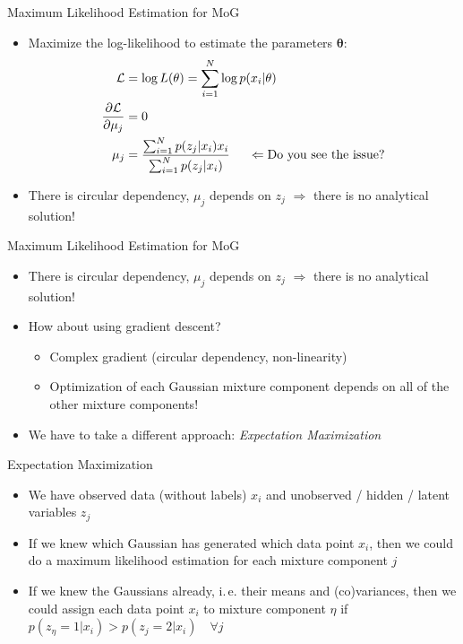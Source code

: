 \begin{frame}{Maximum Likelihood Estimation for MoG}{}
	\begin{itemize}
		\item Maximize the log-likelihood to estimate the parameters $\bm{\theta}$:
		\begin{align}
			\mathcal{L} &= \log L(\theta) = \sum_{i=1}^N \log p(x_i|\theta)\\
			\frac{\partial \mathcal{L}}{\partial \mu_j} &= 0\\
			\mu_j &= \frac{\sum_{i=1}^N p(z_j|x_i) x_i}{\sum_{i=1}^N p(z_j|x_i)}\hspace{0.5cm} \Leftarrow \text{Do you see the issue?}
		\end{align}
		\item There is circular dependency, $\mu_j$ depends on $z_j$ $\Rightarrow$ there is no analytical solution!
	\end{itemize}
\end{frame}

\begin{frame}{Maximum Likelihood Estimation for MoG}{}
	\begin{itemize}
		\item There is circular dependency, $\mu_j$ depends on $z_j$ $\Rightarrow$ there is no analytical solution!
		\item How about using gradient descent?
		\begin{itemize}
			\item Complex gradient (circular dependency, non-linearity)
			\item Optimization of each Gaussian mixture component depends on all of the other mixture components!
		\end{itemize}
		\item We have to take a different approach: \textit{Expectation Maximization}
	\end{itemize}
\end{frame}

\begin{frame}{Expectation Maximization}{}
	\begin{itemize}
		\item We have observed data (without labels) $x_i$ and unobserved / hidden / latent variables $z_j$
		\item If we knew which Gaussian has generated which data point $x_i$, then we could do a maximum likelihood estimation for each mixture component $j$
		\item If we knew the Gaussians already, i.\,e. their means and (co)variances, then we could assign each data point $x_i$ to mixture component $\eta$ if $p(z_\eta = 1|x_i) > p(z_j = 2|x_i) \quad \forall j$
	\end{itemize}
\end{frame}

